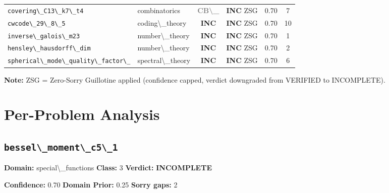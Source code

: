 \documentclass[12pt,a4paper]{article}
\begin{document}
\begin{longtable}{llcccc}
  \texttt{covering\textbackslash{}_C13\textbackslash{}_k7\textbackslash{}_t4} & combinatorics & \textcolor{gray}{\textbf{CB\textbackslash{}_}} & \textcolor{incompleteamber}{\textbf{INC}}  \textcolor{sorryred}{ZSG} & 0.70 & 7 \\
  \texttt{cwcode\textbackslash{}_29\textbackslash{}_8\textbackslash{}_5} & coding\textbackslash{}_theory & \textcolor{incompleteamber}{\textbf{INC}} & \textcolor{incompleteamber}{\textbf{INC}}  \textcolor{sorryred}{ZSG} & 0.70 & 10 \\
  \texttt{inverse\textbackslash{}_galois\textbackslash{}_m23} & number\textbackslash{}_theory & \textcolor{incompleteamber}{\textbf{INC}} & \textcolor{incompleteamber}{\textbf{INC}}  \textcolor{sorryred}{ZSG} & 0.70 & 1 \\
  \texttt{hensley\textbackslash{}_hausdorff\textbackslash{}_dim} & number\textbackslash{}_theory & \textcolor{incompleteamber}{\textbf{INC}} & \textcolor{incompleteamber}{\textbf{INC}}  \textcolor{sorryred}{ZSG} & 0.70 & 2 \\
  \texttt{spherical\textbackslash{}_mode\textbackslash{}_quality\textbackslash{}_factor\textbackslash{}_} & spectral\textbackslash{}_theory & \textcolor{incompleteamber}{\textbf{INC}} & \textcolor{incompleteamber}{\textbf{INC}}  \textcolor{sorryred}{ZSG} & 0.70 & 6 \\

\bottomrule
\end{longtable}

\textbf{Note:} ZSG = Zero-Sorry Guillotine applied (confidence capped, verdict downgraded from VERIFIED to INCOMPLETE).

\newpage

\section{Per-Problem Analysis}

\subsection*{\texttt{bessel\textbackslash{}_moment\textbackslash{}_c5\textbackslash{}_1}}

\textbf{Domain:} special\textbackslash{}_functions \quad \textbf{Class:} 3 \quad \textbf{Verdict:} \textcolor{incompleteamber}{\textbf{INCOMPLETE}}

\textbf{Confidence:} 0.70 \quad \textbf{Domain Prior:} 0.25 \quad \textbf{Sorry gaps:} 2
\end{document}
